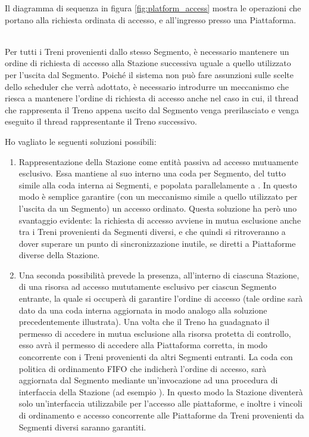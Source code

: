 		Il diagramma di sequenza in figura \ref{fig:platform_access} mostra le operazioni che portano alla richiesta ordinata di accesso, e all'ingresso presso una Piattaforma.
		\begin{description}
			\item{}\\
		
		Per tutti i Treni provenienti dallo stesso Segmento, è necessario mantenere un ordine di richiesta di accesso alla Stazione successiva uguale a quello utilizzato per l'uscita dal Segmento. Poiché il sistema non può fare assunzioni sulle scelte dello scheduler che verrà adottato, è necessario introdurre un meccanismo che riesca a mantenere l'ordine di richiesta di accesso anche nel caso in cui, il thread che rappresenta il Treno appena uscito dal Segmento venga prerilasciato e venga eseguito il thread rappresentante il Treno successivo.

		Ho vagliato le seguenti soluzioni possibili:
		\begin{enumerate}
			\item Rappresentazione della Stazione come entità passiva ad accesso mutuamente esclusivo. Essa mantiene al suo interno una coda per Segmento, del tutto simile alla coda  interna ai Segmenti, e popolata parallelamente a . In questo modo è semplice garantire (con un meccanismo simile a quello utilizzato per l'uscita da un Segmento) un accesso ordinato. Questa soluzione ha però uno svantaggio evidente: la richiesta di accesso avviene in mutua esclusione anche tra i Treni provenienti da Segmenti diversi, e che quindi si ritroveranno a dover superare un punto di sincronizzazione inutile, se diretti a Piattaforme diverse della Stazione.
			
			\item Una seconda possibilità prevede la presenza, all'interno di ciascuna Stazione, di una risorsa ad accesso mututamente esclusivo per ciascun Segmento entrante, la quale si occuperà di garantire l'ordine di accesso (tale ordine sarà dato da una coda interna aggiornata in modo analogo alla soluzione precedentemente illustrata). Una volta che il Treno ha guadagnato il permesso di accedere in mutua esclusione alla risorsa protetta di controllo, esso avrà il permesso di accedere alla Piattaforma corretta, in modo concorrente con i Treni provenienti da altri Segmenti entranti. La coda con politica di ordinamento FIFO che indicherà l'ordine di accesso, sarà aggiornata dal Segmento mediante un'invocazione ad una procedura di interfaccia della Stazione (ad esempio ).
			In questo modo la Stazione diventerà solo un'interfaccia utilizzabile per l'accesso alle piattaforme, e inoltre i vincoli di ordinamento e accesso concorrente alle Piattaforme da Treni provenienti da Segmenti diversi saranno garantiti.
			

\end{enumerate}
\end{description}
